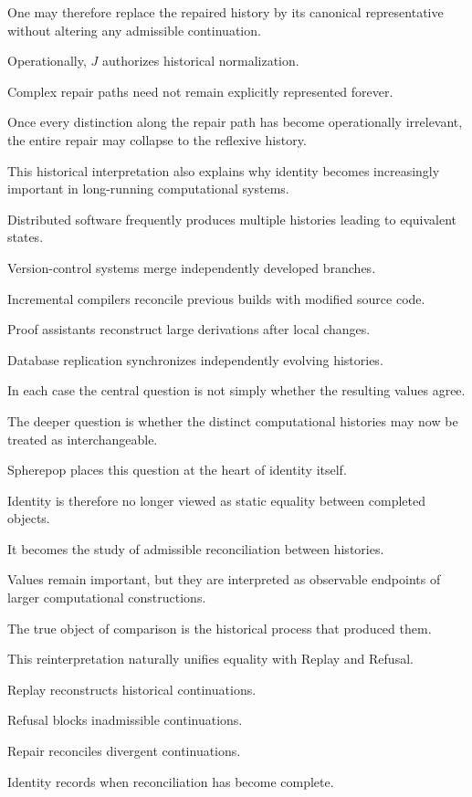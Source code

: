 \documentclass[12pt,oneside]{article}
\theoremstyle{definition}
\theoremstyle{remark}
\begin{document}
One may therefore replace the repaired history by its canonical
representative without altering any admissible continuation.

Operationally, \(J\) authorizes historical normalization.

Complex repair paths need not remain explicitly represented forever.

Once every distinction along the repair path has become operationally
irrelevant, the entire repair may collapse to the reflexive history.

This historical interpretation also explains why identity becomes increasingly
important in long-running computational systems.

Distributed software frequently produces multiple histories leading to
equivalent states.

Version-control systems merge independently developed branches.

Incremental compilers reconcile previous builds with modified source code.

Proof assistants reconstruct large derivations after local changes.

Database replication synchronizes independently evolving histories.

In each case the central question is not simply whether the resulting values
agree.

The deeper question is whether the distinct computational histories may now be
treated as interchangeable.

Spherepop places this question at the heart of identity itself.

Identity is therefore no longer viewed as static equality between completed
objects.

It becomes the study of admissible reconciliation between histories.

Values remain important, but they are interpreted as observable endpoints of
larger computational constructions.

The true object of comparison is the historical process that produced them.

This reinterpretation naturally unifies equality with Replay and Refusal.

Replay reconstructs historical continuations.

Refusal blocks inadmissible continuations.

Repair reconciles divergent continuations.

Identity records when reconciliation has become complete.
\end{document}
